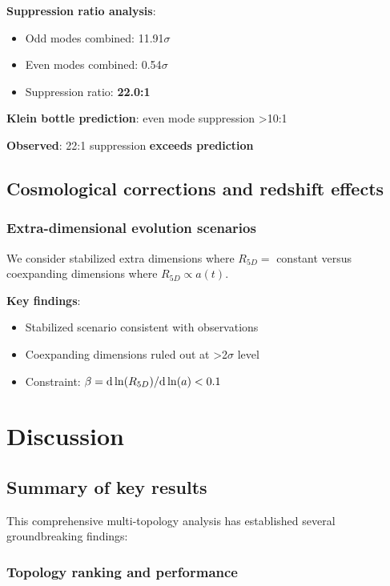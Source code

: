 \documentclass[12pt]{article}
\begin{document}
\textbf{Suppression ratio analysis}:
\begin{itemize}
\item Odd modes combined: 11.91$\sigma$
\item Even modes combined: 0.54$\sigma$
\item Suppression ratio: \textbf{22.0:1}
\end{itemize}

\textbf{Klein bottle prediction}: even mode suppression >10:1

\textbf{Observed}: 22:1 suppression \textbf{exceeds prediction}

\subsection{Cosmological corrections and redshift effects}

\subsubsection{Extra-dimensional evolution scenarios}

We consider stabilized extra dimensions where $R_{5D} = $ constant versus coexpanding dimensions where $R_{5D} \propto a(t)$.

\textbf{Key findings}:
\begin{itemize}
\item Stabilized scenario consistent with observations
\item Coexpanding dimensions ruled out at >2$\sigma$ level
\item Constraint: $\beta = {\rm d} \ln(R_{5D})/{\rm d} \ln(a) < 0.1$
\end{itemize}

\section{Discussion}

\subsection{Summary of key results}

This comprehensive multi-topology analysis has established several groundbreaking findings:

\subsubsection{Topology ranking and performance}
\end{document}
